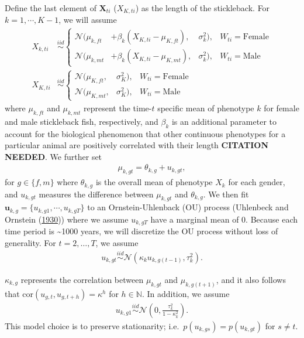 \documentclass[
  12pt,
]{article}
\begin{document}
Define the last element of \(\boldsymbol{X}_{ti}\) (\(X_{K,ti}\)) as the
length of the stickleback. For \(k = 1,\cdots,K - 1\), we will assume
\begin{align}
{X}_{k,ti} & \overset{iid}{\sim}\left\{\begin{array}{llll} \mathcal{N}(\mu_{k,ft} & + \beta_k(X_{K,ti} - \mu_{K,ft}),&\sigma_k^2), & W_{ti} = \text{Female} \\ \mathcal{N}(\mu_{k,mt} & + \beta_k(X_{K,ti} - \mu_{K,mt}),&\sigma_k^2), & W_{ti} = \text{Male} \end{array}\right. \\
{X}_{K,ti} & \overset{iid}{\sim}\left\{\begin{array}{lll} \mathcal{N}(\mu_{K,ft},&\sigma_{K}^2), & W_{ti} = \text{Female} \\ \mathcal{N}(\mu_{K,mt},&\sigma_{K}^2), & W_{ti} = \text{Male} \end{array}\right.
\label{eq:X}
\end{align} where \(\mu_{k,ft}\) and \(\mu_{k,mt}\) represent the
time-\(t\) specific mean of phenotype \(k\) for female and male
stickleback fish, respectively, and \(\beta_k\) is an additional
parameter to account for the biological phenomenon that other continuous
phenotypes for a particular animal are positively correlated with their
length \textbf{CITATION NEEDED}. We further set \begin{align}
\mu_{k,gt} = \theta_{k,g} + u_{k,gt},
\label{eq:mu}
\end{align} for \(g \in \{f,m\}\) where \(\theta_{k,g}\) is the overall
mean of phenotype \(X_k\) for each gender, and \(u_{k,gt}\) measures the
difference between \(\mu_{k,gt}\) and \(\theta_{k,g}\). We then fit
\(\boldsymbol{u}_{k,g} = \{u_{k,g1},\cdots,u_{k,gT}\}\) to an
Ornstein-Uhlenback (OU) process (Uhlenbeck and Ornstein
(\protect\hyperlink{ref-OUProcess}{1930})) where we assume \(u_{k,gT}\)
have a marginal mean of 0. Because each time period is
\textasciitilde1000 years, we will discretize the OU process without
loss of generality. For \(t = 2,\ldots,T\), we assume \begin{align}
u_{k,gt} \overset{iid}{\sim}\mathcal{N}(\kappa_{k} u_{k,g(t-1)} , \tau_k^2).
\label{eq:u_ar1}
\end{align}

\(\kappa_{k,g}\) represents the correlation between \(\mu_{k,gt}\) and
\(\mu_{k,g(t+1)}\), and it also follows that
\(\text{cor}(u_{g,t},u_{g,t+h}) = \kappa^h\) for \(h \in \mathbb{N}\).
In addition, we assume \begin{align}
u_{k,g1} \overset{iid}{\sim}\mathcal{N}\left(0,\frac{\tau_k^2}{1-\kappa_{k}^2}\right).
\label{eq:u1}
\end{align} This model choice is to preserve stationarity;
i.e.~\(p(u_{k,gs}) = p(u_{k,gt})\) for \(s \neq t\).
\end{document}
